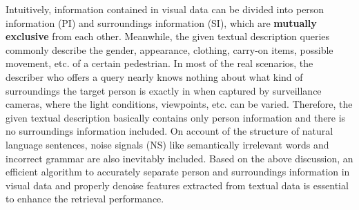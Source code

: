 \documentclass[sigconf]{acmart}
\begin{document}
Intuitively, information contained in visual data can be divided into person information (PI) and surroundings information (SI), which are \textbf{mutually exclusive} from each other. Meanwhile, the given textual description queries commonly describe the gender, appearance, clothing, carry-on items, possible movement, etc. of a certain pedestrian. In most of the real scenarios, the describer who offers a query nearly knows nothing about what kind of surroundings the target person is exactly in when captured by surveillance cameras, where the light conditions, viewpoints, etc. can be varied. Therefore, the given textual description basically contains only person information and there is no surroundings information included. On account of the structure of natural language sentences, noise signals (NS) like semantically irrelevant words and incorrect grammar are also inevitably included. Based on the above discussion, an efficient algorithm to accurately separate person and surroundings information in visual data and properly denoise features extracted from textual data is essential to enhance the retrieval performance.
\end{document}
